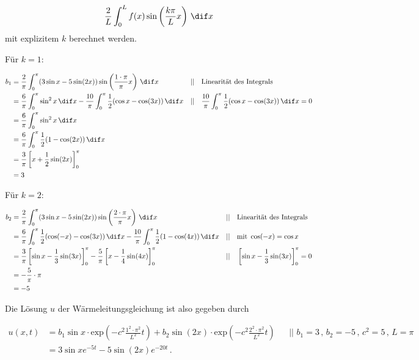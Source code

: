 \begin{equation*}
    \frac{2}{L} \int_0^L f(x) \sin \left(\frac{k \pi}{L}x \right) \,\dif x
\end{equation*} mit explizitem $k$ berechnet werden. \\

\newpage

Für $k=1$:

\begin{align*}
    b_1 &= \frac{2}{\pi} \int_0^\pi (3 \sin x - 5 \sin (2x)) \sin \left(\frac{1\cdot \pi}{\pi}x \right) \,\dif x && || \quad \text{Linearität des Integrals}\\
        &= \frac{6}{\pi} \int_0^\pi \sin^2 x \,\dif x - \frac{10}{\pi} \int_0^\pi \frac{1}{2} (\cos x - \cos (3x)) \,\dif x  && || \quad \frac{10}{\pi} \int_0^\pi \frac{1}{2} (\cos x - \cos (3x)) \,\dif x = 0\\
        &= \frac{6}{\pi} \int_0^\pi \sin^2 x \,\dif x \\
        &= \frac{6}{\pi} \int_0^\pi \frac{1}{2}(1-\cos(2x)) \,\dif x \\
        &= \frac{3}{\pi} \left[x + \frac{1}{2} \sin(2x) \right]_0^\pi \\
        &= 3
\end{align*}

Für $k=2$:

\begin{align*}
    b_2 &= \frac{2}{\pi} \int_0^\pi (3 \sin x - 5 \sin (2x)) \sin \left(\frac{2\cdot \pi}{\pi}x \right) \,\dif x && || \quad \text{Linearität des Integrals}\\
        &= \frac{6}{\pi} \int_0^\pi \frac{1}{2}(\cos(-x) - \cos(3x)) \,\dif x - \frac{10}{\pi} \int_0^\pi \frac{1}{2} (1 - \cos(4x)) \,\dif x && || \quad \text{mit } \cos(-x) = \cos x \\
        &= \frac{3}{\pi} \left[\sin x - \frac{1}{3} \sin (3x) \right]_0^\pi - \frac{5}{\pi} \left[x -\frac{1}{4} \sin(4x) \right]_0^\pi && || \quad \left[\sin x - \frac{1}{3} \sin (3x) \right]_0^\pi = 0 \\
        &= -\frac{5}{\pi} \cdot \pi \\
        &= -5
\end{align*}

Die Lösung $u$ der Wärmeleitungsgleichung ist also gegeben durch

\begin{align*}
    u(x,t) &= b_1 \sin x \cdot \text{exp}\left(-c^2\frac{1^2 \cdot \pi^2}{L^2}t\right) + b_2 \sin (2x) \cdot \text{exp}\left(-c^2\frac{2^2 \cdot \pi^2}{L^2}t\right) && || \,\, b_1 = 3\,,\,  b_2 =-5\,,\,  c^2 = 5\,,\, L = \pi \\
           &= 3 \sin x e^{-5t} - 5 \sin(2x) e^{-20t} \,. 
\end{align*}

